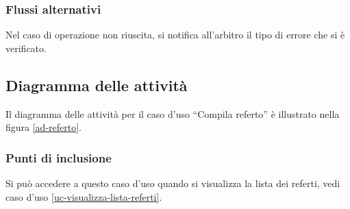 \subsubsection*{Flussi alternativi}
Nel caso di operazione non riuscita, si notifica all'arbitro il tipo di errore che si è verificato.

\subsection*{Diagramma delle attività}
Il diagramma delle attività per il caso d'uso ``Compila referto'' è illustrato nella figura \vref{ad-referto}.

\subsubsection*{Punti di inclusione}
Si può accedere a questo caso d'uso quando si visualizza la lista dei referti, vedi caso d'uso \vref{uc-visualizza-lista-referti}.

